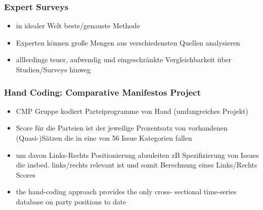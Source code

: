 \documentclass[11pt]{article}
\begin{document}
\subsubsection{Expert Surveys}
\label{sec:org9d66161}
\begin{itemize}
\item in idealer Welt beste/genauste Methode
\item Experten können große Mengen aus verschiedensten Quellen analysieren
\item alllerdings teuer, aufwendig und eingeschränkte Vergleichbarkeit über Studien/Surveys hinweg
\end{itemize}
\subsubsection{Hand Coding: Comparative Manifestos Project}
\label{sec:org715072f}
\begin{itemize}
\item CMP Gruppe kodiert Parteiprogramme von Hand (umfangreiches Projekt)
\item Score für die Parteien ist der jeweilige Prozentsatz von vorhandenen (Quasi-)Sätzen die in eine von 56 Issue Kategorien fallen
\item um davon Links-Rechts Positionierung abzuleiten zB Spezifizierung von Issues die insbed. links/rechts relevant ist und somit Berechnung eines Links/Rechts Scores
\item the hand-coding approach provides the only cross- sectional time-series database on party positions to date
\end{itemize}
\end{document}
